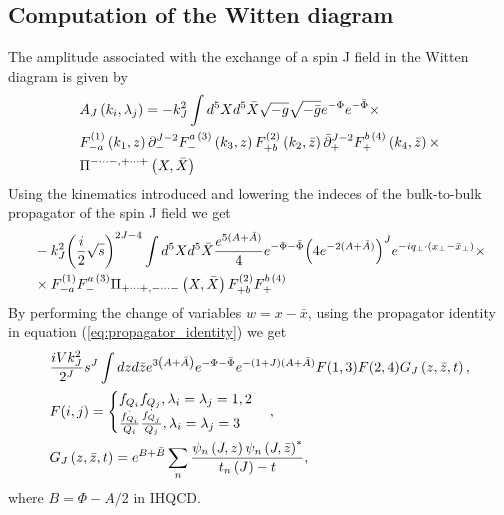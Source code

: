 \documentclass[preprint, 12pt]{elsarticle}
\begin{document}
\subsection{Computation of the Witten diagram}
The amplitude associated with the exchange of a spin J field in the Witten diagram is given by
\begin{align}
&A_J \left(k_i, \lambda_j\right) = - k_J^2 \int d^5X d^5 \bar{X} \sqrt{-g} \sqrt{-\bar{g}} e^{-\Phi} e^{-\bar{\Phi}} \times  \notag \\ 
&F_{- a}^{(1)} \left(k_1, z\right) \partial_{-}^{J-2}F^{a \, (3)}_{-} \left(k_3, z \right)  F_{+ b}^{(2)} \left(k_2, \bar{z}\right) \bar{\partial}_{+}^{J-2}F^{b \, (4)}_{+} \left(k_4, \bar{z} \right) \times \notag \\
& \Pi^{- \dots - , + \dots +}\left(X, \bar{X}\right)
\end{align}
Using the kinematics introduced and lowering the indeces of the bulk-to-bulk propagator of the spin J field we get
\begin{align}
&- k_J^2 {\left( \frac{i}{2} \sqrt{s}\right)}^{2J-4} \int d^5X d^5\bar{X} \frac{e^{5 (A+\bar{A}) }}{4} e^{-\Phi - \bar{\Phi}} {\left(4 e^{-2(A+\bar{A})}\right)}^J e^{-i q_\perp \cdot \left(x_\perp - \bar{x}_\perp\right)} \times \notag \\
& \times F_{-a}^{(1)}F^{a \, (3)}_{-} \Pi_{+\dots+, - \dots -}\left(X, \bar{X}\right)  F_{+ b}^{(2)}F^{b \, (4)}_{+}
\end{align}
By performing the change of variables $w = x - \bar{x}$, using the propagator identity in equation (\ref{eq:propagator_identity}) we get
\begin{align}
&\frac{i V k_J^2}{2^J} s^J \int dz d\bar{z} e^{3\left(A+\bar{A}\right)} e^{- \Phi - \bar{\Phi}} e^{-(1+J)(A+\bar{A})} F(1,3)F(2,4) G_J \left(z, \bar{z}, t\right), \notag \\
& F(i,j) = 
\begin{cases}
f_{Q_i} f_{Q_j} , \lambda_i = \lambda_j = 1,2 \\
\frac{\dot{f_{Q_i}}}{Q_i} \frac{\dot{f_{Q_j}}}{Q_j}, \lambda_i = \lambda_j = 3
\end{cases}, \notag \\
&G_J \left(z, \bar{z}, t\right) = e^{B+\bar{B}} \sum_n \frac{\psi_n\left(J, z\right) {\psi_n \left(J, \bar{z}\right)}^*}{t_n\left(J\right) - t},
\end{align}
where $B = \Phi - A/2$ in IHQCD.
\end{document}
